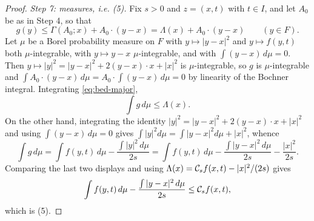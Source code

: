 \begin{proof}
\emph{Step 7: measures, i.e. (5).}
Fix $s>0$ and $z=(x,t)$ with $t\in I$, and let $A_0$ be as in Step 4, so that
\begin{equation}\label{eq:bed-major}
  g(y)\le\Gamma(A_0;x)+A_0\cdot(y-x)=\Lambda(x)+A_0\cdot(y-x)
  \qquad(y\in F).
\end{equation}
Let $\mu$ be a Borel probability measure on $F$ with $y\mapsto|y-x|^2$ and
$y\mapsto f(y,t)$ both $\mu$-integrable, with $y\mapsto y-x$ $\mu$-integrable,
and with $\int(y-x)\,d\mu=0$. Then $y\mapsto|y|^2=|y-x|^2+2(y-x)\cdot x+|x|^2$
is $\mu$-integrable, so $g$ is $\mu$-integrable and $\int A_0\cdot(y-x)\,d\mu
=A_0\cdot\int(y-x)\,d\mu=0$ by linearity of the Bochner integral. Integrating
\eqref{eq:bed-major},
\[
  \int g\,d\mu\le\Lambda(x).
\]
On the other hand, integrating the identity
$|y|^2=|y-x|^2+2(y-x)\cdot x+|x|^2$ and using $\int(y-x)\,d\mu=0$ gives
$\int|y|^2d\mu=\int|y-x|^2d\mu+|x|^2$, whence
\[
  \int g\,d\mu=\int f(y,t)\,d\mu-\frac{\int|y|^2\,d\mu}{2s}
   =\int f(y,t)\,d\mu-\frac{\int|y-x|^2\,d\mu}{2s}-\frac{|x|^2}{2s}.
\]
Comparing the last two displays and using
$\Lambda(x)=\mathcal{C}_sf(x,t)-|x|^2/(2s)$ gives
\[
  \int f(y,t)\,d\mu-\frac{\int|y-x|^2\,d\mu}{2s}\le\mathcal{C}_sf(x,t),
\]
which is (5).
\end{proof}
